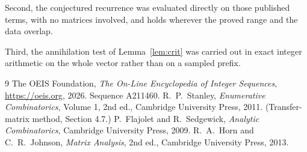 \documentclass[11pt,a4paper]{article}
\theoremstyle{plain}
\theoremstyle{definition}
\begin{document}
Second, the conjectured recurrence was evaluated directly on those published terms, with no
matrices involved, and holds wherever the proved range and the data overlap.

Third, the annihilation test of Lemma~\ref{lem:crit} was carried out in exact integer
arithmetic on the whole vector rather than on a sampled prefix.

\begin{thebibliography}{9}
 The OEIS Foundation, \emph{The On-Line Encyclopedia of Integer
Sequences}, \url{https://oeis.org}, 2026. Sequence A211460.
 R.~P.~Stanley, \emph{Enumerative Combinatorics}, Volume 1, 2nd ed.,
Cambridge University Press, 2011. (Transfer-matrix method, Section 4.7.)
 P.~Flajolet and R.~Sedgewick, \emph{Analytic Combinatorics}, Cambridge
University Press, 2009.
 R.~A.~Horn and C.~R.~Johnson, \emph{Matrix Analysis}, 2nd ed., Cambridge
University Press, 2013.
\end{thebibliography}
\end{document}

